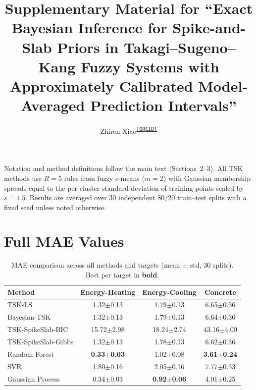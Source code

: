 \documentclass[review,1p,times]{elsarticle}
\providecommand{\orcid}[1]{\textsuperscript{\href{https://orcid.org/#1}{\texttt{[ORCID]}}}}
\begin{document}
\begin{frontmatter}
\title{Supplementary Material for ``Exact Bayesian Inference for Spike-and-Slab Priors in Takagi--Sugeno--Kang Fuzzy Systems with Approximately Calibrated Model-Averaged Prediction Intervals''}
\author[addr]{Zhiren Xiao\orcid{0009-0008-2164-4557}}
\address[addr]{Guangdong University of Finance, Guangzhou, China}
\end{frontmatter}

Notation and method definitions follow the main text (Sections~2--3).
All TSK methods use $R=5$ rules from fuzzy $c$-means ($m=2$) with Gaussian membership spreads equal to the per-cluster standard deviation of training points scaled by $s=1.5$.
Results are averaged over 30 independent 80/20 train--test splits with a fixed seed unless noted otherwise.

\section{Full MAE Values}

\begin{table}[htbp]
\centering
\caption{MAE comparison across all methods and targets (mean $\pm$ std, 30 splits). Best per target in \textbf{bold}.}
\label{tab:mae}
\footnotesize
\setlength{\tabcolsep}{3pt}
\begin{tabular}{lccc}
\toprule
Method & Energy-Heating & Energy-Cooling & Concrete \\
\midrule
TSK-LS              & 1.32$\pm$0.13 & 1.79$\pm$0.13 & 6.65$\pm$0.36 \\
Bayesian-TSK        & 1.32$\pm$0.13 & 1.79$\pm$0.13 & 6.64$\pm$0.36 \\
TSK-SpikeSlab-BIC   & 15.72$\pm$2.98 & 18.24$\pm$2.74 & 43.16$\pm$4.00 \\
TSK-SpikeSlab-Gibbs & 1.32$\pm$0.13 & 1.78$\pm$0.13 & 6.62$\pm$0.36 \\
Random Forest       & \textbf{0.33$\pm$0.03} & 1.02$\pm$0.08 & \textbf{3.61$\pm$0.24} \\
SVR                 & 1.80$\pm$0.16 & 2.05$\pm$0.16 & 7.77$\pm$0.33 \\
Gaussian Process    & 0.34$\pm$0.03 & \textbf{0.92$\pm$0.06} & 4.01$\pm$0.25 \\
\bottomrule
\end{tabular}
\end{table}
\end{document}
